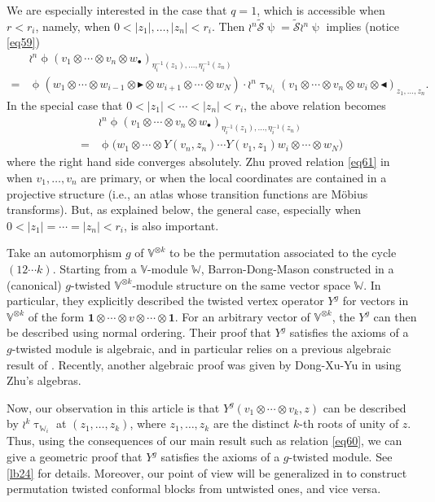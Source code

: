 \documentclass[12pt,a4paper,notitlepage]{article}
\theoremstyle{definition}
\theoremstyle{plain}
\newcommand{\mc}{\mathcal}
\newcommand{\wtd}{\widetilde}
\newcommand{\id}{\mathbf{1}}
\newcommand{\blt}{\bullet}
\newcommand{\Vbb}{\mathbb V}
\newcommand{\Wbb}{\mathbb W}
\newcommand{\btl}{\blacktriangleleft}
\newcommand{\btr}{\blacktriangleright}
\numberwithin{equation}{section}
\begin{document}
We are especially interested in the case that $q=1$, which is accessible when $r<r_i$, namely, when $0<|z_1|,\dots,|z_n|<r_i$. Then $\wr^n\wtd{\mc S}\uppsi=\wtd{\mc S}\wr^n\uppsi$ implies (notice \eqref{eq59})
\begin{align}
&\wr^n\upphi(v_1\otimes\cdots\otimes v_n\otimes w_\blt)_{\eta_i^{-1}(z_1),\dots,\eta_i^{-1}(z_n)}\nonumber\\
=&\upphi(w_1\otimes\cdots\otimes w_{i-1} \otimes \btr\otimes w_{i+1}\otimes\cdots\otimes w_N)\cdot\wr^n\uptau_{\Wbb_i}(v_1\otimes\cdots\otimes v_n\otimes w_i\otimes\btl)_{z_1,\dots,z_n}.\label{eq60}
\end{align}
In the special case that $0<|z_1|<\cdots<|z_n|<r_i$, the above relation becomes
\begin{align}
&\wr^n\upphi(v_1\otimes\cdots\otimes v_n\otimes w_\blt)_{\eta_i^{-1}(z_1),\dots,\eta_i^{-1}(z_n)}\nonumber\\
=&\upphi\big(w_1\otimes\cdots\otimes Y(v_n,z_n)\cdots Y(v_1,z_1)w_i\otimes\cdots\otimes w_N\big)\label{eq61}	
\end{align}
where the right hand side converges absolutely. Zhu proved relation \eqref{eq61} in \cite[Thm. 6.2]{Zhu94} when $v_1,\dots,v_n$ are primary, or when the local coordinates are contained in a projective structure (i.e., an atlas whose transition functions are M\"obius transforms). But, as explained below, the general case, especially when $0<|z_1|=\cdots=|z_n|<r_i$, is also important.

Take an automorphism $g$ of $\Vbb^{\otimes k}$ to be the permutation associated to the cycle $(12\cdots k)$. Starting from a $\Vbb$-module $\Wbb$, Barron-Dong-Mason constructed in \cite{BDM02} a (canonical) $g$-twisted $\Vbb^{\otimes k}$-module structure on the same vector space $\Wbb$. In particular, they explicitly described the twisted vertex operator $Y^g$ for vectors in $\Vbb^{\otimes k}$ of the form $\id\otimes\cdots\otimes v\otimes\cdots\otimes\id$. For an arbitrary vector of $\Vbb^{\otimes k}$, the $Y^g$  can then be described using normal ordering. Their proof that $Y^g$ satisfies the axioms of a $g$-twisted module is algebraic, and in particular relies on a previous algebraic result of \cite{Li96}. Recently, another algebraic proof was given by Dong-Xu-Yu in \cite{DXY21} using Zhu's algebras.

Now, our observation in this article is that $Y^g(v_1\otimes\cdots\otimes v_k,z)$ can be described by $\wr^k\uptau_{\Wbb_i}$ at $(z_1,\dots,z_k)$, where $z_1,\dots,z_k$ are the distinct $k$-th roots of unity of $z$. Thus, using the consequences of our main result such as relation \eqref{eq60}, we can give a geometric proof that $Y^g$ satisfies the axioms of a $g$-twisted module. See \eqref{lb24} for details. Moreover,   our point of view will be generalized in \cite{Gui21} to construct permutation twisted conformal blocks from untwisted ones, and vice versa.
\end{document}
